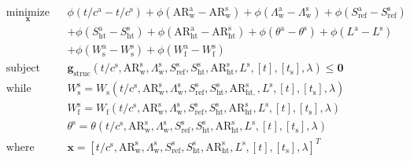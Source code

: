 \documentclass[11pt]{article}
\begin{document}
\begin{equation*}
    \begin{aligned}
        & \underset{\mathbf{x}}{\text{minimize}}
        & & \phi\left(t / c^{\mathrm{a}}-t / c^{\mathrm{s}}\right)+\phi\left(\mathrm{AR}_{\mathrm{w}}^{\mathrm{a}}-\mathrm{AR}_{\mathrm{w}}^{\mathrm{s}}\right)+\phi\left(\Lambda_{\mathrm{w}}^{\mathrm{a}}-\Lambda_{\mathrm{w}}^{\mathrm{s}}\right)+\phi\left(S_{\mathrm{ref}}^{\mathrm{a}}-S_{\mathrm{ref}}^{\mathrm{s}}\right) \\
    & & & +\phi\left(S_{\mathrm{ht}}^{\mathrm{a}}-S_{\mathrm{ht}}^{\mathrm{s}}\right)+\phi\left(\mathrm{AR}_{\mathrm{ht}}^{\mathrm{a}}-\mathrm{AR}_{\mathrm{ht}}^{\mathrm{s}}\right)+\phi\left(\theta^{\mathrm{a}}-\theta^{\mathrm{s}}\right)+\phi\left(L^{\mathrm{a}}-L^{\mathrm{s}}\right) \\
    & & & +\phi\left(W_{\mathrm{s}}^{\mathrm{a}}-W_{\mathrm{s}}^{\mathrm{s}}\right)+\phi\left(W_{\mathrm{f}}^{\mathrm{a}}-W_{\mathrm{f}}^{\mathrm{s}}\right) \\
    & \text{subject to}
        & & \mathbf{g}_{\mathrm{struc}}\left(t / c^{\mathrm{s}}, \mathrm{AR}_{\mathrm{w}}^{\mathrm{s}}, \Lambda_{\mathrm{w}}^{\mathrm{s}}, S_{\mathrm{ref}}^{\mathrm{s}}, S_{\mathrm{ht}}^{\mathrm{s}}, \mathrm{AR}_{\mathrm{ht}}^{\mathrm{s}}, L^{\mathrm{s}},[t],\left[t_{\mathrm{s}}\right], \lambda\right) \leq \mathbf{0} \\
    & \text{while solving}
        & &   W_{\mathrm{s}}^{\mathrm{s}}=W_{\mathrm{s}}\left(t / c^{\mathrm{s}}, \mathrm{AR}_{\mathrm{w}}^{\mathrm{s}}, \Lambda_{\mathrm{w}}^{\mathrm{s}}, S_{\mathrm{ref}}^{\mathrm{s}}, S_{\mathrm{ht}}^{\mathrm{s}}, \mathrm{AR}_{\mathrm{ht},}^{\mathrm{s}}, L^{\mathrm{s}},[t],\left[t_{\mathrm{s}}\right], \lambda\right) \\
    & & & W_{\mathrm{f}}^{\mathrm{s}}=W_{\mathrm{f}}\left(t / c^{\mathrm{s}}, \mathrm{AR}_{\mathrm{w}}^{\mathrm{s}}, \Lambda_{\mathrm{w}}^{\mathrm{s}}, S_{\mathrm{ref}}^{\mathrm{s}}, S_{\mathrm{ht}}^{\mathrm{s}}, \mathrm{AR}_{\mathrm{ht}}^{\mathrm{s}}, L^{\mathrm{s}},[t],\left[t_{\mathrm{s}}\right], \lambda\right) \\
    & & & \theta^{\mathrm{s}}=\theta\left(t / c^{\mathrm{s}}, \mathrm{AR}_{\mathrm{w}}^{\mathrm{s}}, \Lambda_{\mathrm{w}}^{\mathrm{s}}, S_{\mathrm{ref}}^{\mathrm{s}}, S_{\mathrm{ht}}^{\mathrm{s}}, \mathrm{AR}_{\mathrm{ht}}^{\mathrm{s}}, L^{\mathrm{s}},[t],\left[t_{\mathrm{s}}\right], \lambda\right)\\
    & \text{where}
        & & \mathbf{x} = \left[t / c^{\mathrm{s}}, \mathrm{AR}_{\mathrm{w}}^{\mathrm{s}}, \Lambda_{\mathrm{w}}^{\mathrm{s}}, S_{\mathrm{ref}}^{\mathrm{s}}, S_{\mathrm{ht}}^{\mathrm{s}}, \mathrm{AR}_{\mathrm{ht}}^{\mathrm{s}}, L^{\mathrm{s}},[t],\left[t_{\mathrm{s}}\right], \lambda\right]^\textit{T}
    \end{aligned}
\end{equation*}
\end{document}
